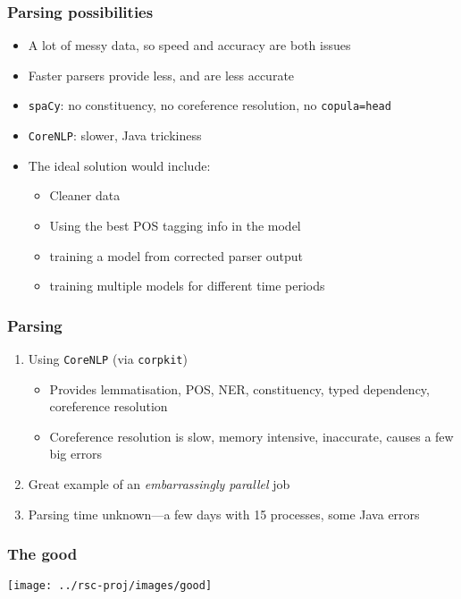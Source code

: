 \documentclass{beamer}       %
\begin{document}
\begin{frame}
\frametitle{Parsing possibilities}
\begin{itemize}
    \item A lot of messy data, so speed and accuracy are both issues
    \item Faster parsers provide less, and are less accurate
    \item \texttt{spaCy}: no constituency, no coreference resolution, no \texttt{copula=head}
    \item \texttt{CoreNLP}: slower, Java trickiness
    \item The ideal solution would include:
    \begin{itemize}
        \item Cleaner data 
        \item Using the best POS tagging info in the model
        \item training a model from corrected parser output
        \item training multiple models for different time periods
    \end{itemize}
\end{itemize}

\end{frame}

\begin{frame}
\frametitle{Parsing}
\begin{enumerate}
    \item Using \texttt{CoreNLP} (via \texttt{corpkit})
    \begin{itemize}
        \item Provides lemmatisation, POS, NER, constituency, typed dependency, coreference resolution
        \item Coreference resolution is slow, memory intensive, inaccurate, causes a few big errors
    \end{itemize}
    \item Great example of an \emph{embarrassingly parallel} job
    \item Parsing time unknown---a few days with 15 processes, some Java errors
\end{enumerate}
\end{frame}


\begin{frame}
    \frametitle{The good}
    \centering
    \texttt{[image: ../rsc-proj/images/good]}
\end{frame}
\end{document}
